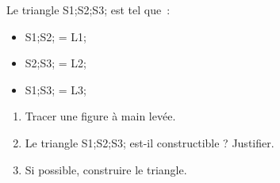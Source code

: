 \documentclass[exercice]{thedocument}%
\begin{document}
%
Le triangle \<S1;\<S2;\<S3; est tel que~:
\begin{itemize}
    \item \<S1;\<S2; = \<L1;
    \item \<S2;\<S3; = \<L2;
    \item \<S1;\<S3; = \<L3;
\end{itemize}
\begin{enumerate}
    \item Tracer une figure à main levée.
    \item Le triangle \<S1;\<S2;\<S3; est-il constructible ? Justifier.
    \item Si possible, construire le triangle.
\end{enumerate}
\end{document}
